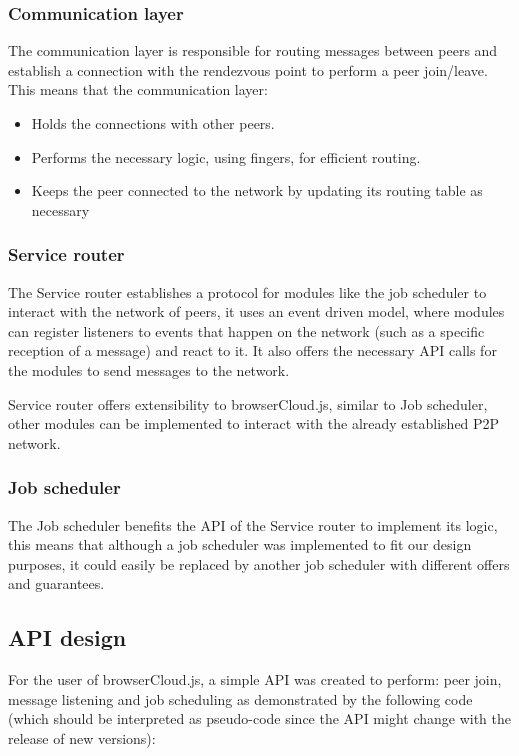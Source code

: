 \subsubsection{Communication layer}

The communication layer is responsible for routing messages between peers and establish a connection with the rendezvous point to perform a peer join/leave. This means that the communication layer:

\begin{itemize}
    \item Holds the connections with other peers.
    \item Performs the necessary logic, using fingers, for efficient routing.
    \item Keeps the peer connected to the network by updating its routing table as necessary
\end{itemize}

\subsubsection{Service router}

The Service router establishes a protocol for modules like the job scheduler to interact with the network of peers, it uses an event driven model, where modules can register listeners to events that happen on the network (such as a specific reception of a message) and react to it. It also offers the necessary API calls for the modules to send messages to the network.

Service router offers extensibility to browserCloud.js, similar to Job scheduler, other modules can be implemented to interact with the already established P2P network.

\subsubsection{Job scheduler}

The Job scheduler benefits the API of the Service router to implement its logic, this means that although a job scheduler was implemented to fit our design purposes, it could easily be replaced by another job scheduler with different offers and guarantees.

\subsection{API design}

For the user of browserCloud.js, a simple API was created to perform: peer join, message listening and job scheduling as demonstrated by the following code (which should be interpreted as pseudo-code since the API might change with the release of new versions):

